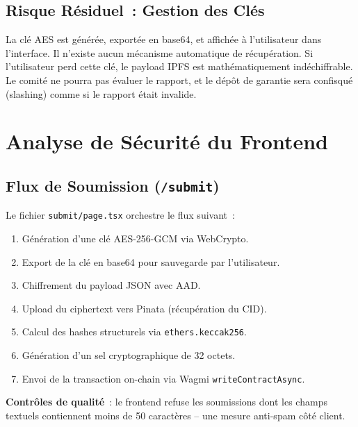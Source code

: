 \documentclass[12pt, a4paper]{report}
\begin{document}
\section{Risque R\'{e}siduel~: Gestion des Cl\'{e}s}
La cl\'{e} AES est g\'{e}n\'{e}r\'{e}e, export\'{e}e en base64, et affich\'{e}e \`{a} l'utilisateur dans l'interface. Il n'existe aucun m\'{e}canisme auto\-matique de r\'{e}cup\'{e}ration. Si l'utilisateur perd cette cl\'{e}, le payload IPFS est math\'{e}matiquement ind\'{e}chiffrable. Le comit\'{e} ne pourra pas \'{e}valuer le rapport, et le d\'{e}p\^{o}t de garantie sera confisqu\'{e} (slashing) comme si le rapport \'{e}tait invalide.

\chapter{Analyse de S\'{e}curit\'{e} du Frontend}

\section{Flux de Soumission (\texttt{/submit})}
Le fichier \texttt{submit/page.tsx} orchestre le flux suivant~:
\begin{enumerate}
    \item G\'{e}n\'{e}ration d'une cl\'{e} AES-256-GCM via WebCrypto.
    \item Export de la cl\'{e} en base64 pour sauvegarde par l'utilisateur.
    \item Chiffrement du payload JSON avec AAD.
    \item Upload du ciphertext vers Pinata (r\'{e}cup\'{e}ration du CID).
    \item Calcul des hashes structurels via \texttt{ethers.keccak256}.
    \item G\'{e}n\'{e}ration d'un sel cryptographique de 32 octets.
    \item Envoi de la transaction on-chain via Wagmi \texttt{writeContractAsync}.
\end{enumerate}

\textbf{Contr\^{o}les de qualit\'{e}}~: le frontend refuse les soumissions dont les champs textuels contiennent moins de 50 caract\`{e}res -- une mesure anti-spam c\^{o}t\'{e} client.
\end{document}
